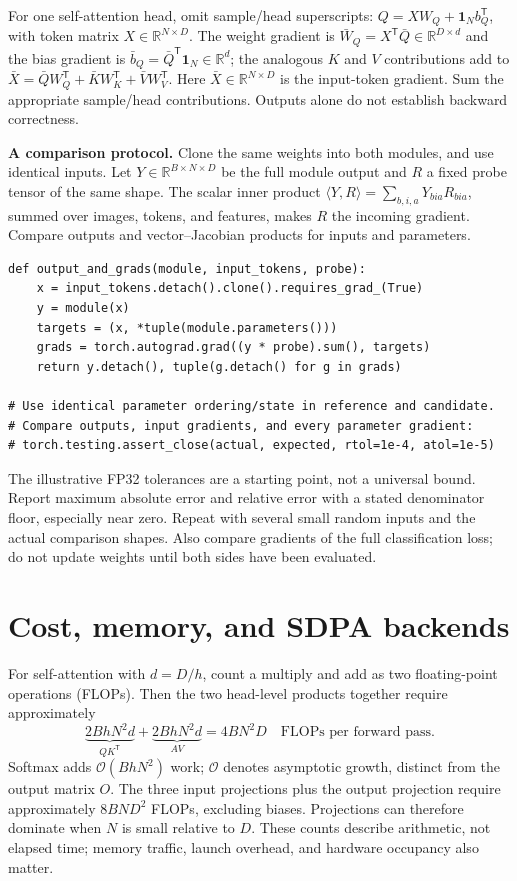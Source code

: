 \documentclass[11pt,a4paper,oneside]{report}
\newcommand{\R}{\mathbb{R}}
\begin{document}
For one self-attention head, omit sample/head superscripts:
$Q=XW_Q+\mathbf1_N b_Q^{\mathsf T}$, with token matrix $X\in\R^{N\times D}$.
The weight gradient is $\bar W_Q=X^{\mathsf T}\bar Q\in\R^{D\times d}$
and the bias gradient is $\bar b_Q=\bar Q^{\mathsf T}\mathbf1_N\in\R^d$;
the analogous $K$ and $V$ contributions add to
$\bar X=\bar QW_Q^{\mathsf T}+\bar KW_K^{\mathsf T}+\bar VW_V^{\mathsf T}$.
Here $\bar X\in\R^{N\times D}$ is the input-token gradient. Sum the
appropriate sample/head contributions. Outputs alone do not establish backward correctness.

\textbf{A comparison protocol.} Clone the same weights into both modules,
and use identical inputs. Let $Y\in\R^{B\times N\times D}$
be the full module output and $R$ a fixed probe tensor of the same shape.
The scalar inner product $\langle Y,R\rangle=\sum_{b,i,a}Y_{bia}R_{bia}$,
summed over images, tokens, and features, makes $R$ the incoming gradient.
Compare outputs and vector--Jacobian products for inputs and parameters.

\begin{lstlisting}[style=python]
def output_and_grads(module, input_tokens, probe):
    x = input_tokens.detach().clone().requires_grad_(True)
    y = module(x)
    targets = (x, *tuple(module.parameters()))
    grads = torch.autograd.grad((y * probe).sum(), targets)
    return y.detach(), tuple(g.detach() for g in grads)

# Use identical parameter ordering/state in reference and candidate.
# Compare outputs, input gradients, and every parameter gradient:
# torch.testing.assert_close(actual, expected, rtol=1e-4, atol=1e-5)
\end{lstlisting}

The illustrative FP32 tolerances are a starting point, not a universal bound.
Report maximum absolute error and relative error with a stated denominator
floor, especially near zero. Repeat with several small random inputs and the
actual comparison shapes. Also compare gradients of the full classification
loss; do not update weights until both sides have been evaluated.

\newpage
\section{Cost, memory, and SDPA backends}
For self-attention with $d=D/h$, count a multiply and add as two floating-point
operations (FLOPs). Then
the two head-level products together require approximately
\begin{equation}
 \underbrace{2BhN^2d}_{QK^{\mathsf T}}
 +\underbrace{2BhN^2d}_{AV}=4BN^2D
 \quad\text{FLOPs per forward pass}.
\end{equation}
Softmax adds $\mathcal O(BhN^2)$ work; $\mathcal O$ denotes asymptotic growth,
distinct from the output matrix $O$. The three input projections plus the output
projection require approximately $8BND^2$ FLOPs, excluding biases. Projections
can therefore dominate when $N$ is small relative to $D$. These counts describe
arithmetic, not elapsed time; memory traffic, launch overhead, and hardware
occupancy also matter.
\end{document}

